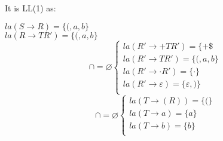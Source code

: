 It is LL(1) as:
\begin{center}
    $la(S \rightarrow R) = \{(, a, b\}$ \\
    $la(R \rightarrow TR') = \{(, a, b\}$ \\
    \begin{equation}
      \cap = \varnothing
      \begin{cases}
        la(R' \rightarrow +TR') = \{+\$ \\
        la(R' \rightarrow TR') = \{(, a, b\} \\
        la(R' \rightarrow \cdot R') = \{\cdot\} \\
        la(R' \rightarrow \varepsilon) = \{ \varepsilon, )\} \\
    \end{cases}  
    \end{equation}
    \begin{equation}
        \cap = \varnothing
        \begin{cases}
            la(T \rightarrow (R)) = \{(\} \\
            la(T \rightarrow a) = \{a\} \\
            la(T \rightarrow b) = \{b\} \\  
        \end{cases}
    \end{equation}
\end{center}


